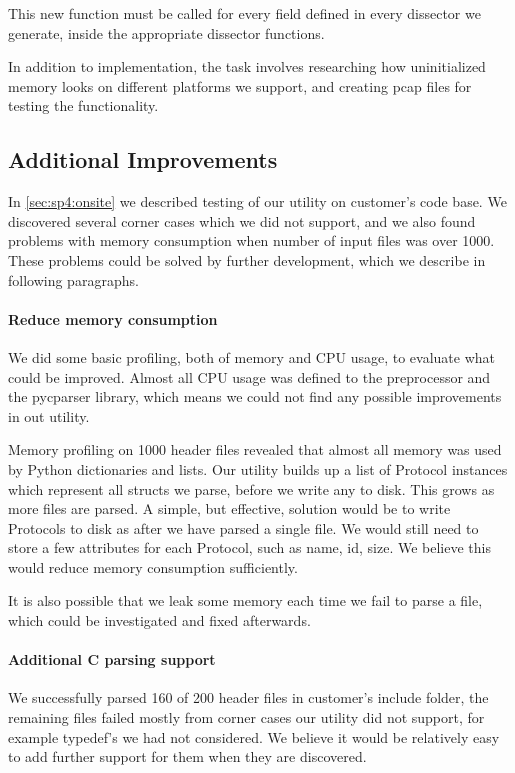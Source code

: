 This new function must be called for every field defined in every dissector we generate, inside the appropriate dissector functions.

In addition to implementation, the task involves researching how uninitialized memory looks on different platforms we support, and creating pcap files for testing the functionality.

\subsection{Additional Improvements}
\label{sec:conc:addimps}
In \autoref{sec:sp4:onsite} we described testing of our utility on customer's
code base. We discovered several corner cases which we did not support, and we
also found problems with memory consumption when number of input files was
over 1000. These problems could be solved by further development, which we
describe in following paragraphs.

\paragraph{Reduce memory consumption}
We did some basic profiling, both of memory and CPU usage, to evaluate what
could be improved. Almost all CPU usage was defined to the preprocessor and
the pycparser library, which means we could not find any possible improvements
in out utility.

Memory profiling on 1000 header files revealed that almost all memory was used
by Python dictionaries and lists. Our utility builds up a list of Protocol
instances which represent all structs we parse, before we write any to disk.
This grows as more files are parsed. A simple, but effective, solution would
be to write Protocols to disk as after we have parsed a single file. We would
still need to store a few attributes for each Protocol, such as name, id,
size. We believe this would reduce memory consumption sufficiently.

It is also possible that we leak some memory each time we fail to parse a
file, which could be investigated and fixed afterwards.

\paragraph{Additional C parsing support}
We successfully parsed 160 of 200 header files in customer's include folder,
the remaining files failed mostly from corner cases our utility did not
support, for example typedef's we had not considered. We believe it would be
relatively easy to add further support for them when they are discovered.

